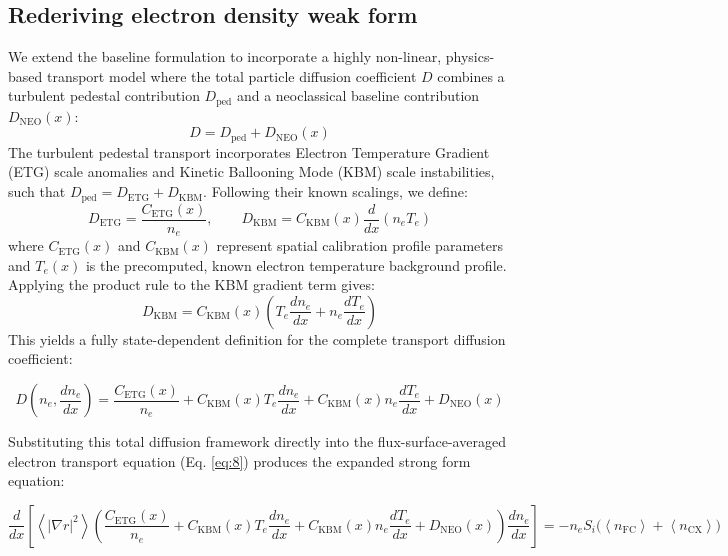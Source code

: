 \documentclass[twocolumn,secnumarabic,amssymb, nobibnotes, aps, prd]{revtex4-2}
\renewcommand{\ne}{n_{e}}  %
\newcommand{\nfc}{n_{\mathrm{FC}}}
\newcommand{\ncx}{n_{\mathrm{CX}}}
\newcommand{\Si}{S_{i}}
\newcommand{\Dped}{D_{\mathrm{ped}}}
\newcommand{\fsa}[1]{\left\langle #1 \right\rangle}
\newcommand{\gradrsq}{\fsa{|\nabla r|^{2}}}
\begin{document}


\subsection{Rederiving electron density weak form}
\label{sec:ne-weak-gen}

We extend the baseline formulation to incorporate a highly non-linear, physics-based transport model where the total particle diffusion coefficient $D$ combines a turbulent pedestal contribution $\Dped$ and a neoclassical baseline contribution $D_{\mathrm{NEO}}(x)$:
\begin{equation}
D = \Dped + D_{\mathrm{NEO}}(x)
\end{equation}
The turbulent pedestal transport incorporates Electron Temperature Gradient (ETG) scale anomalies and Kinetic Ballooning Mode (KBM) scale instabilities, such that $\Dped = D_{\mathrm{ETG}} + D_{\mathrm{KBM}}$. Following their known scalings, we define:
\begin{equation}
D_{\mathrm{ETG}} = \frac{C_{\mathrm{ETG}}(x)}{\ne}, \qquad D_{\mathrm{KBM}} = C_{\mathrm{KBM}}(x) \frac{d}{dx}(\ne T_e)
\end{equation}
where $C_{\mathrm{ETG}}(x)$ and $C_{\mathrm{KBM}}(x)$ represent spatial calibration profile parameters and $T_e(x)$ is the precomputed, known electron temperature background profile. Applying the product rule to the KBM gradient term gives:
\begin{equation}
D_{\mathrm{KBM}} = C_{\mathrm{KBM}}(x) \left( T_e \frac{d\ne}{dx} + \ne \frac{dT_e}{dx} \right)
\end{equation}
This yields a fully state-dependent definition for the complete transport diffusion coefficient:
\begin{widetext}
\begin{equation}
D\left(\ne, \frac{d\ne}{dx}\right) = \frac{C_{\mathrm{ETG}}(x)}{\ne} + C_{\mathrm{KBM}}(x) T_e \frac{d\ne}{dx} + C_{\mathrm{KBM}}(x) \ne \frac{dT_e}{dx} + D_{\mathrm{NEO}}(x)
\end{equation}
\end{widetext}

Substituting this total diffusion framework directly into the flux-surface-averaged electron transport equation (Eq. \ref{eq:8}) produces the expanded strong form equation:
\begin{widetext}
\begin{equation}
\frac{d}{dx}\left[\gradrsq \left( \frac{C_{\mathrm{ETG}}(x)}{\ne} + C_{\mathrm{KBM}}(x) T_e \frac{d\ne}{dx} + C_{\mathrm{KBM}}(x) \ne \frac{dT_e}{dx} + D_{\mathrm{NEO}}(x) \right) \frac{d\ne}{dx}\right] = -\ne\Si\bigl(\fsa{\nfc}+\fsa{\ncx}\bigr)
\end{equation}
\end{widetext}
\end{document}
